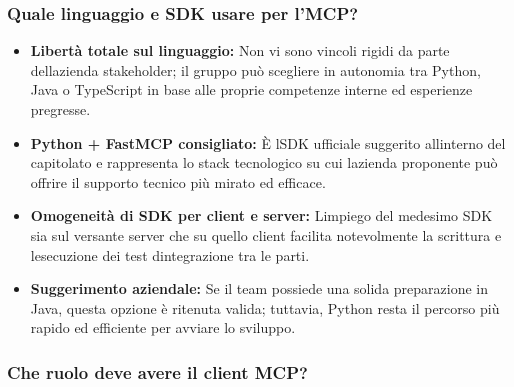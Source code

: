 \documentclass[12pt,a4paper]{article}
\newcommand{\tightlist}{\setlength{\itemsep}{1pt}\setlength{\parskip}{0pt}}
\begin{document}
\hypertarget{quale-linguaggio-e-sdk-usare-per-lmcp}{%
\subsubsection{\texorpdfstring{Quale linguaggio e SDK usare per l'MCP?}{Quale linguaggio e SDK usare per l'MCP?}}}

\begin{itemize}
\tightlist
\item \textbf{Libertà totale sul linguaggio:} Non vi sono vincoli rigidi da parte dell\textquotesingle azienda stakeholder; il gruppo può scegliere in autonomia tra Python, Java o TypeScript in base alle proprie competenze interne ed esperienze pregresse.
\item \textbf{Python + FastMCP consigliato:} È l\textquotesingle SDK ufficiale suggerito all\textquotesingle interno del capitolato e rappresenta lo stack tecnologico su cui l\textquotesingle azienda proponente può offrire il supporto tecnico più mirato ed efficace.
\item \textbf{Omogeneità di SDK per client e server:} L\textquotesingle impiego del medesimo SDK sia sul versante server che su quello client facilita notevolmente la scrittura e l\textquotesingle esecuzione dei test d\textquotesingle integrazione tra le parti.
\item \textbf{Suggerimento aziendale:} Se il team possiede una solida preparazione in Java, questa opzione è ritenuta valida; tuttavia, Python resta il percorso più rapido ed efficiente per avviare lo sviluppo.
\end{itemize}

\hypertarget{che-ruolo-deve-avere-il-client-mcp}{%
\subsubsection{\texorpdfstring{Che ruolo deve avere il client MCP?}{Che ruolo deve avere il client MCP?}}}
\end{document}
